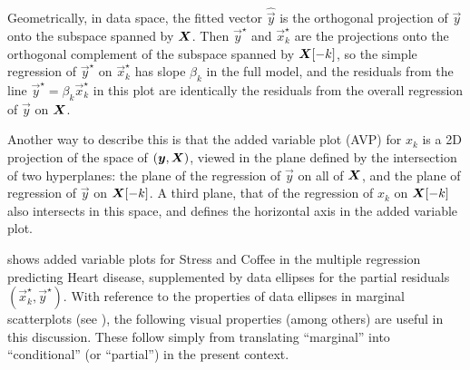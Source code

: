 Geometrically, in data space, the fitted vector $\widehat{\vec{y}}$ is the orthogonal projection of $\vec{y}$
onto the subspace spanned by $\bm{X}$. Then $\vec{y}^\star$ and $\vec{x}^\star_k$ are the projections onto
the orthogonal complement of the subspace spanned by $\bm{X}[-k]$, so
the simple regression of $\vec{y}^\star$ on $\vec{x}^\star_k$ has slope $\beta_k$ in the full model,
and the residuals from the line $\vec{y}^\star = \beta_k \vec{x}^\star_k$ in this plot are identically
the residuals from the overall regression of $\vec{y}$ on $\bm{X}$. 

Another way to describe this is that the added variable plot (AVP) for $x_k$ is a 2D projection of the space of
$(\bm{y}, \bm{X})$, viewed in the plane defined by the intersection of two hyperplanes:
the plane of the regression of $\vec{y}$ on all of $\bm{X}$, and the plane of regression of 
$\vec{y}$ on $\bm{X}[-k]$. A third plane, that of the regression of $x_k$ on $\bm{X}[-k]$
also intersects in this space, and defines the horizontal axis in the added variable plot.


 shows added variable plots for Stress and Coffee in the multiple regression predicting Heart disease,
supplemented by data ellipses for the partial residuals $(\vec{x}_k^\star, \vec{y}^\star)$.  With reference to the properties
of data ellipses in marginal scatterplots (see ), the following visual properties (among others)
are useful in this discussion.  These follow simply from translating ``marginal'' into ``conditional'' (or ``partial'')
in the present context.

